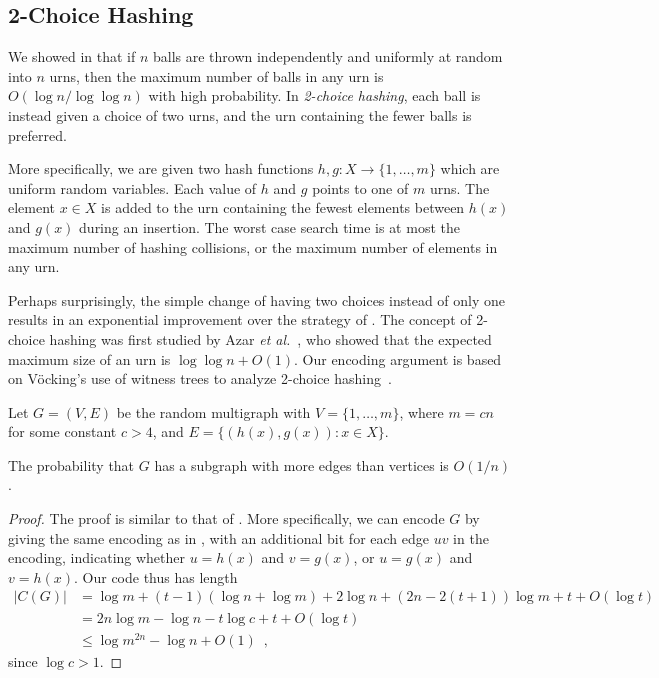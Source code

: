 \documentclass{patmorin}
\begin{document}
\subsection{2-Choice Hashing}

We showed in  that if $n$ balls are thrown independently
and uniformly at random into $n$ urns, then the maximum number of
balls in any urn is $O(\log n/\log \log n)$ with high probability. In
\emph{2-choice hashing}, each ball is instead given a choice of two
urns, and the urn containing the fewer balls is preferred.

More specifically, we are given two hash functions $h, g : X \to \{1,
\ldots, m\}$ which are uniform random variables. Each value of $h$ and
$g$ points to one of $m$ urns. The element $x \in X$ is added to the
urn containing the fewest elements between $h(x)$ and $g(x)$ during an
insertion. The worst case search time is at most the maximum number of
hashing collisions, or the maximum number of elements in any urn.

Perhaps surprisingly, the simple change of having two choices instead
of only one results in an exponential improvement over the strategy of
. The concept of 2-choice hashing was first studied by 
Azar \emph{et
  al.}~\cite{azar:multiplechoice}, who showed that the expected
maximum size of an urn is $\log \log n + O(1)$. Our encoding argument
is based on V\"{o}cking's use of witness trees to analyze 2-choice
hashing~\cite{vocking:witness}.

Let $G = (V, E)$ be the random multigraph with $V = \{1, \ldots, m\}$,
where $m = cn$ for some constant $c > 4$, and
$E = \{(h(x), g(x)) : x \in X\}$.

\begin{lem}
  The probability that $G$ has a subgraph with more edges than 
  vertices is
  $O(1/n)$.
\end{lem}
\begin{proof}
  The proof is similar to that of . More
  specifically, we can encode $G$ by giving the same encoding as in
  , with an additional bit for each edge $uv$
  in the encoding, indicating whether $u = h(x)$ and $v = g(x)$, or $u
  = g(x)$ and $v = h(x)$. Our code thus has length
  \begin{align*}
    |C(G)| &= \log m + (t - 1)(\log n + \log m) + 2 \log n + (2n - 2(t + 1))\log m + t + O(\log t) \\
           &= 2n \log m - \log n - t \log c + t + O(\log t) \\
           &\le \log m^{2n} - \log n + O(1) \enspace ,
  \end{align*}
  since $\log c > 1$.
\end{proof}
\end{document}
